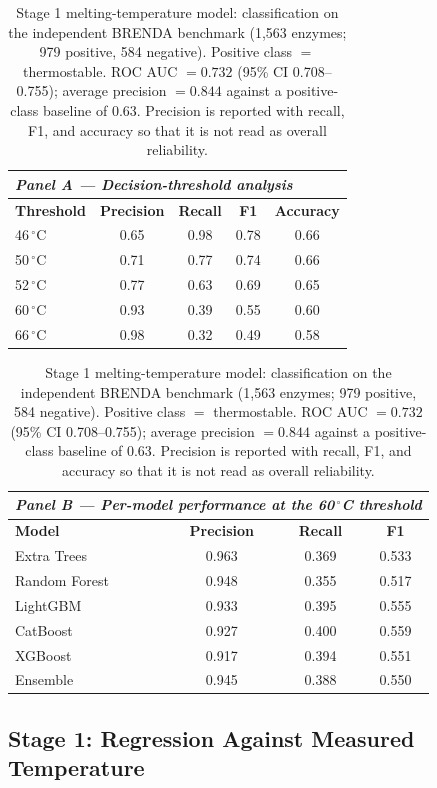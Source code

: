 \documentclass[journal,article,submit,moreauthors]{Definitions/mdpi}
\begin{document}
\begin{table}[H]
\caption{Stage 1 melting-temperature model: classification on the independent BRENDA
benchmark (1{,}563 enzymes; 979 positive, 584 negative). Positive class $=$ thermostable.
ROC AUC $=0.732$ (95\% CI 0.708--0.755); average precision $=0.844$ against a
positive-class baseline of 0.63. Precision is reported with recall, F1, and accuracy so
that it is not read as overall reliability.}
\label{tab:stage1}
\begin{tabular}{lcccc}
\toprule
\multicolumn{5}{l}{\textit{Panel A --- Decision-threshold analysis}}\\
\midrule
\textbf{Threshold} & \textbf{Precision} & \textbf{Recall} & \textbf{F1} & \textbf{Accuracy}\\
\midrule
46\,$^{\circ}$C & 0.65 & 0.98 & 0.78 & 0.66\\
50\,$^{\circ}$C & 0.71 & 0.77 & 0.74 & 0.66\\
52\,$^{\circ}$C & 0.77 & 0.63 & 0.69 & 0.65\\
60\,$^{\circ}$C & 0.93 & 0.39 & 0.55 & 0.60\\
66\,$^{\circ}$C & 0.98 & 0.32 & 0.49 & 0.58\\
\bottomrule
\end{tabular}

\vspace{8pt}
\begin{tabular}{lccc}
\toprule
\multicolumn{4}{l}{\textit{Panel B --- Per-model performance at the 60\,$^{\circ}$C threshold}}\\
\midrule
\textbf{Model} & \textbf{Precision} & \textbf{Recall} & \textbf{F1}\\
\midrule
Extra Trees   & 0.963 & 0.369 & 0.533\\
Random Forest & 0.948 & 0.355 & 0.517\\
LightGBM      & 0.933 & 0.395 & 0.555\\
CatBoost      & 0.927 & 0.400 & 0.559\\
XGBoost       & 0.917 & 0.394 & 0.551\\
Ensemble      & 0.945 & 0.388 & 0.550\\
\bottomrule
\end{tabular}
\end{table}

\subsection{Stage 1: Regression Against Measured Temperature}
\label{sec:stage1-reg}
\end{document}
